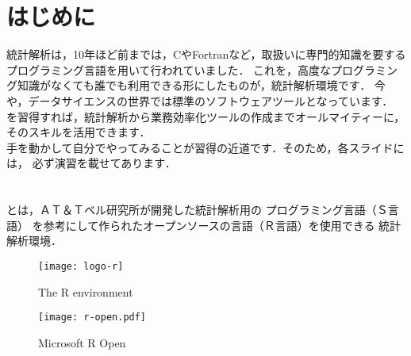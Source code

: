 \def\Slide{} %
\def\PrintLecture{1} %
\def\PrintSolution{1} %

\def\MyClass{\R ・\RStudio のインストール}

\def\DirCourse{\string~/AQUOS/Default_Folder/TIU/lectures} %




\ifthenelse{\Slide=1}{\date{}}{}
\maketitle
\thispagestyle{fancy}
\tableofcontents
\newpage

\section{はじめに}

統計解析は，10年ほど前までは，CやFortranなど，取扱いに専門的知識を要する
プログラミング言語を用いて行われていました．
これを，高度なプログラミング知識がなくても誰でも利用できる形にしたものが，統計解析環境\R です．
今や，データサイエンスの世界では標準のソフトウェアツールとなっています．\\[3mm]

\R を習得すれば，統計解析から業務効率化ツールの作成までオールマイティーに，
そのスキルを活用できます．\\[3mm]

手を動かして自分でやってみることが\R 習得の近道です．そのため，各スライドには，
必ず演習を載せてあります．

\section{\R}

\R とは，ＡＴ＆Ｔベル研究所が開発した統計解析用の
プログラミング言語（Ｓ言語）
を参考にして作られたオープンソースの言語（Ｒ言語）を使用できる
統計解析環境．\\[5mm]

\begin{minipage}{0.45\textwidth}
  \begin{figure}[H]%
  \centering
  \texttt{[image: logo-r]}
  \label{fig:logo-r}
  \caption{The R environment}
  \end{figure}
\end{minipage}
\hspace{3mm}
\begin{minipage}{0.45\textwidth}
  \begin{figure}[H]
  \centering
  \texttt{[image: r-open.pdf]}
  \label{fig:r-open}
  \caption{Microsoft R Open}
  \end{figure}
\end{minipage}

